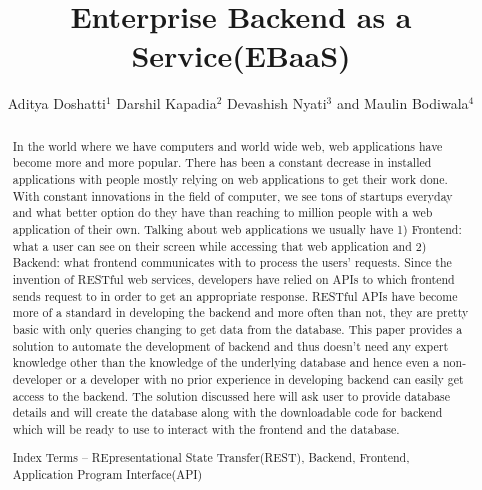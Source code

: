 \documentclass[letterpaper, 10 pt, conference]{ieeeconf}
\title{\LARGE \bf
Enterprise Backend as a Service(EBaaS)
}
\author{Aditya Doshatti$^{1}$ Darshil Kapadia$^{2}$ Devashish Nyati$^{3}$ and Maulin Bodiwala$^{4}$%
}
\begin{document}
\maketitle
\thispagestyle{empty}
\pagestyle{empty}


\begin{abstract}

In the world where we have computers and world wide web, web applications have become more and more popular. There has been a constant decrease in installed applications with people mostly relying on web applications to get their work done. With constant innovations in the field of computer, we see tons of startups everyday and what better option do they have than reaching to million people with a web application of their own. Talking about web applications we usually have 1) Frontend: what a user can see on their screen while accessing that web application and 2) Backend: what frontend communicates with to process the users’ requests. Since the invention of RESTful web services, developers have relied on APIs to which frontend sends request to in order to get an appropriate response. RESTful APIs have become more of a standard in developing the backend and more often than not, they are pretty basic with only queries changing to get data from the database. This paper provides a solution to automate the development of backend and thus doesn’t need any expert knowledge other than the knowledge of the underlying database and hence even a non-developer or a developer with no prior experience in developing backend can easily get access to the backend. The solution discussed here will ask user to provide database details and will create the database along with the downloadable code for backend which will be ready to use to interact with the frontend and the database.

Index Terms -- REpresentational State Transfer(REST), Backend, Frontend, Application Program Interface(API)

\end{abstract}


\end{document}
